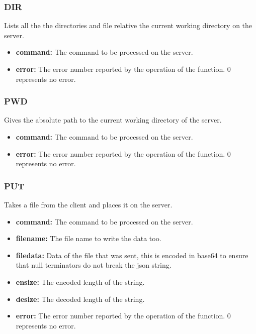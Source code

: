 \documentclass{article}
\begin{document}
\subsubsection{DIR}
Lists all the the directories and file relative the current working directory on the server.
\begin{itemize}
\item \textbf{command:} The command to be processed on the server.
\item \textbf{error:} The error number reported by the operation of the function. 0 represents no error.
\end{itemize}
\subsubsection{PWD}
Gives the absolute path to the current working directory of the server.
\begin{itemize}
\item \textbf{command:} The command to be processed on the server.
\item \textbf{error:} The error number reported by the operation of the function. 0 represents no error.
\end{itemize}
\subsubsection{PUT}
Takes a file from the client and places it on the server.
\begin{itemize}
\item \textbf{command:} The command to be processed on the server.
\item \textbf{filename:} The file name to write the data too.
\item \textbf{filedata:} Data of the file that was sent, this is encoded in base64 to ensure that null terminators do not break the json string.
\item \textbf{ensize:} The encoded length of the string.
\item \textbf{desize:} The decoded length of the string.
\item \textbf{error:} The error number reported by the operation of the function. 0 represents no error.
\end{itemize}
\end{document}
